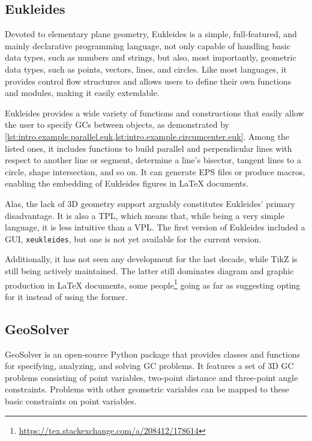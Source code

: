 \subsection{Eukleides}%
\label{sec:related.constraints.eukleides}

Devoted to elementary plane geometry, Eukleides is a simple, full-featured, and
mainly declarative programming language, not only capable of handling basic data
types, such as numbers and strings, but also, most importantly, geometric data
types, such as points, vectors, lines, and circles.  Like most languages, it
provides control flow structures and allows users to define their own functions
and modules, making it easily extendable.

Eukleides provides a wide variety of functions and constructions that easily
allow the user to specify \acp{GC} between objects, as demonstrated by
\cref{lst:intro.example.parallel.euk,lst:intro.example.circumcenter.euk}.  Among
the listed ones, it includes functions to build parallel and perpendicular lines
with respect to another line or segment, determine a line's bisector, tangent
lines to a circle, shape intersection, and so on.  It can generate \ac{EPS}
files or produce macros, enabling the embedding of Eukleides figures in \LaTeX{}
documents.

Alas, the lack of 3D geometry support arguably constitutes Eukleides' primary
disadvantage.  It is also a \ac{TPL}, which means that, while being a very
simple language, it is less intuitive than a \ac{VPL}.  The first version of
Eukleides included a \ac{GUI}, \texttt{xeukleides}, but one is not yet available
for the current version.

Additionally, it has not seen any development for the last decade, while
\ac{TikZ} is still being actively maintained.  The latter still dominates
diagram and graphic production in \LaTeX{} documents, some
people\footnote{\url{https://tex.stackexchange.com/a/208412/178614}} going as
far as suggesting opting for it instead of using the former.

\subsection{GeoSolver}%
\label{sec:related.constraints.geosolver}

GeoSolver is an open-source Python package that provides classes and functions
for specifying, analyzing, and solving \ac{GC} problems.  It features a set of
3D \ac{GC} problems consisting of point variables, two-point distance and
three-point angle constraints.  Problems with other geometric variables can be
mapped to these basic constraints on point variables.

